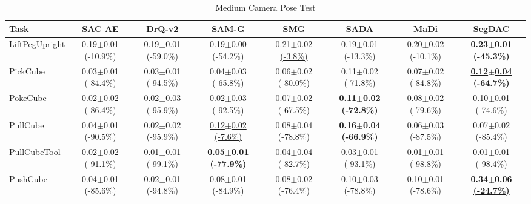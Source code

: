 \begin{table}[htbp]
\centering
\scriptsize
\caption{Medium Camera Pose Test}
\label{tab:appendix_cameraposetest_medium}
\begin{adjustbox}{max width=\textwidth}
\begin{tabular}{l*{7}{c}}
\toprule
\textbf{Task} & \textbf{SAC AE} & \textbf{DrQ-v2} & \textbf{SAM-G} & \textbf{SMG} & \textbf{SADA} & \textbf{MaDi} & \textbf{SegDAC} \\
\midrule
LiftPegUpright & 0.19$\pm$0.01 \scriptsize{(-10.9\%)} & 0.19$\pm$0.01 \scriptsize{(-59.0\%)} & 0.19$\pm$0.00 \scriptsize{(-54.2\%)} & \underline{0.21$\pm$0.02 \scriptsize{(-3.8\%)}} & 0.19$\pm$0.01 \scriptsize{(-13.3\%)} & 0.20$\pm$0.02 \scriptsize{(-10.1\%)} & \textbf{0.23$\pm$0.01 \scriptsize{(-45.3\%)}} \\
PickCube & 0.03$\pm$0.01 \scriptsize{(-84.4\%)} & 0.03$\pm$0.01 \scriptsize{(-94.5\%)} & 0.04$\pm$0.03 \scriptsize{(-65.8\%)} & 0.06$\pm$0.02 \scriptsize{(-80.0\%)} & 0.11$\pm$0.02 \scriptsize{(-71.8\%)} & 0.07$\pm$0.02 \scriptsize{(-84.8\%)} & \textbf{\underline{0.12$\pm$0.04 \scriptsize{(-64.7\%)}}} \\
PokeCube & 0.02$\pm$0.02 \scriptsize{(-86.4\%)} & 0.02$\pm$0.03 \scriptsize{(-95.9\%)} & 0.02$\pm$0.03 \scriptsize{(-92.5\%)} & \underline{0.07$\pm$0.02 \scriptsize{(-67.5\%)}} & \textbf{0.11$\pm$0.02 \scriptsize{(-72.8\%)}} & 0.08$\pm$0.02 \scriptsize{(-79.6\%)} & 0.10$\pm$0.01 \scriptsize{(-74.6\%)} \\
PullCube & 0.04$\pm$0.01 \scriptsize{(-90.5\%)} & 0.02$\pm$0.02 \scriptsize{(-95.9\%)} & \underline{0.12$\pm$0.02 \scriptsize{(-7.6\%)}} & 0.08$\pm$0.04 \scriptsize{(-78.8\%)} & \textbf{0.16$\pm$0.04 \scriptsize{(-66.9\%)}} & 0.06$\pm$0.03 \scriptsize{(-87.5\%)} & 0.07$\pm$0.02 \scriptsize{(-85.4\%)} \\
PullCubeTool & 0.02$\pm$0.02 \scriptsize{(-91.1\%)} & 0.01$\pm$0.01 \scriptsize{(-99.1\%)} & \textbf{\underline{0.05$\pm$0.01 \scriptsize{(-77.9\%)}}} & 0.04$\pm$0.04 \scriptsize{(-82.7\%)} & 0.03$\pm$0.01 \scriptsize{(-93.1\%)} & 0.01$\pm$0.01 \scriptsize{(-98.8\%)} & 0.01$\pm$0.01 \scriptsize{(-98.4\%)} \\
PushCube & 0.04$\pm$0.01 \scriptsize{(-85.6\%)} & 0.02$\pm$0.01 \scriptsize{(-94.8\%)} & 0.08$\pm$0.01 \scriptsize{(-84.9\%)} & 0.08$\pm$0.02 \scriptsize{(-76.4\%)} & 0.10$\pm$0.03 \scriptsize{(-78.8\%)} & 0.10$\pm$0.01 \scriptsize{(-78.6\%)} & \textbf{\underline{0.34$\pm$0.06 \scriptsize{(-24.7\%)}}} \\

\end{tabular}
\end{adjustbox}
\end{table}

